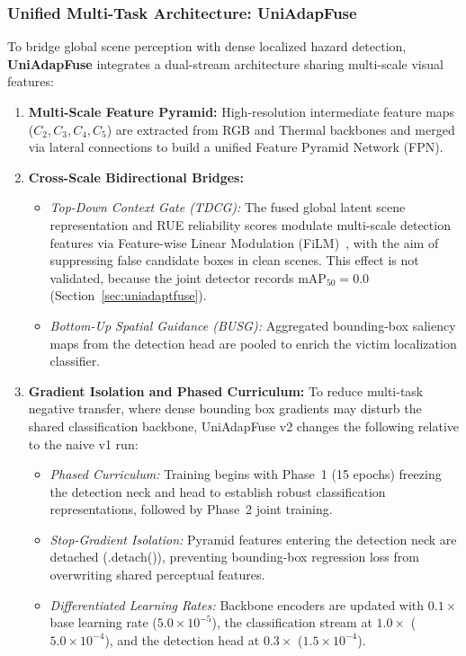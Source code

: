 \documentclass[journal]{IEEEtran}
\begin{document}
\subsubsection{Unified Multi-Task Architecture: UniAdapFuse}
\label{sec:uniadaptfuse_arch}

To bridge global scene perception with dense localized hazard detection, \textbf{UniAdapFuse} integrates a dual-stream architecture sharing multi-scale visual features:
\begin{enumerate}
    \item \textbf{Multi-Scale Feature Pyramid:} High-resolution intermediate feature maps ($C_2, C_3, C_4, C_5$) are extracted from RGB and Thermal backbones and merged via lateral connections to build a unified Feature Pyramid Network (FPN).
    \item \textbf{Cross-Scale Bidirectional Bridges:}
    \begin{itemize}
        \item \textit{Top-Down Context Gate (TDCG):} The fused global latent scene representation and RUE reliability scores modulate multi-scale detection features via Feature-wise Linear Modulation (FiLM)~\cite{perez2018film}, with the aim of suppressing false candidate boxes in clean scenes. This effect is not validated, because the joint detector records $\mathrm{mAP}_{50}=0.0$ (Section~\ref{sec:uniadaptfuse}).
        \item \textit{Bottom-Up Spatial Guidance (BUSG):} Aggregated bounding-box saliency maps from the detection head are pooled to enrich the victim localization classifier.
    \end{itemize}
    \item \textbf{Gradient Isolation and Phased Curriculum:}
    To reduce multi-task negative transfer, where dense bounding box gradients may disturb the shared classification backbone, UniAdapFuse v2 changes the following relative to the naive v1 run:
    \begin{itemize}
        \item \textit{Phased Curriculum:} Training begins with Phase~1 (15 epochs) freezing the detection neck and head to establish robust classification representations, followed by Phase~2 joint training.
        \item \textit{Stop-Gradient Isolation:} Pyramid features entering the detection neck are detached (.detach()), preventing bounding-box regression loss from overwriting shared perceptual features.
        \item \textit{Differentiated Learning Rates:} Backbone encoders are updated with $0.1\times$ base learning rate ($5.0 \times 10^{-5}$), the classification stream at $1.0\times$ ($5.0 \times 10^{-4}$), and the detection head at $0.3\times$ ($1.5 \times 10^{-4}$).

\end{itemize}
\end{enumerate}
\end{document}
